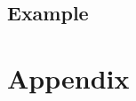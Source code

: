 \documentclass{article}\usepackage[]{graphicx}\usepackage[]{xcolor}
\begin{document}
\begin{multicols}{2}
\section{Example}

\vspace{2em}
\nocite{tidyverse}
\nocite{patchwork}
\nocite{cumstats}

\begin{tiny}

\end{tiny}
\end{multicols}

\newpage
\onecolumn
\section{Appendix}
\end{document}
